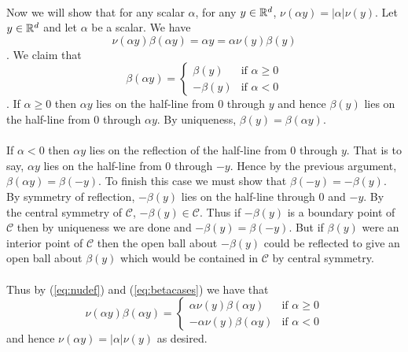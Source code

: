 \documentclass[letterpaper,12pt,oneside,onecolumn]{article}
\newcommand{\cC}{\mathcal{C}} \newcommand{\cD}{\mathcal{D}}
\begin{document}
\paragraph{}
Now we will show that for any scalar $\alpha$, for any $y \in \mathbb{R}^d$, $\nu(\alpha y) = |\alpha| \nu(y)$. Let $y \in \mathbb{R}^d$ and let $\alpha$ be a scalar. We have
\begin{equation}
\nu(\alpha y) \beta(\alpha y) = \alpha y = \alpha \nu(y) \beta(y) \label{eq:nudef}
\end{equation}
. We claim that \begin{equation} \beta(\alpha y) = \begin{cases} \beta(y) &\text{if $\alpha \geq 0$} \\
-\beta(y) &\text{if $\alpha <0$}\end{cases}\label{eq:betacases}\end{equation}
. If $\alpha \geq 0$ then $\alpha y$ lies on the half-line from $0$ through $y$ and hence $\beta(y)$ lies on the half-line from $0$ through $\alpha y$. By uniqueness, $\beta(y) = \beta(\alpha y)$.
\paragraph{}
If $\alpha < 0$ then $\alpha y$ lies on the reflection of the half-line from $0$ through $y$. That is to say, $\alpha y$ lies on the half-line from $0$ through $-y$. Hence by the previous argument, $\beta(\alpha y) = \beta(-y)$. To finish this case we must show that $\beta(-y) = -\beta(y)$. By symmetry of reflection, $-\beta(y)$ lies on the half-line through $0$ and $-y$. By the central symmetry of $\cC$, $-\beta(y) \in \cC$. Thus if $-\beta(y)$ is a boundary point of $\cC$ then by uniqueness we are done and $-\beta(y) = \beta(-y)$. But if $\beta(y)$ were an interior point of $\cC$ then the open ball about $-\beta(y)$ could be reflected to give an open ball about $\beta(y)$ which would be contained in $\cC$ by central symmetry.
\paragraph{}
Thus by (\ref{eq:nudef}) and (\ref{eq:betacases}) we have that
$$\nu(\alpha y) \beta(\alpha y) = \begin{cases}\alpha \nu(y) \beta(\alpha y) &\text{if $\alpha \geq 0$}\\
-\alpha \nu(y) \beta(\alpha y) &\text{if $\alpha < 0$} \end{cases}$$
and hence $\nu(\alpha y) = |\alpha| \nu(y)$ as desired.
\end{document}
